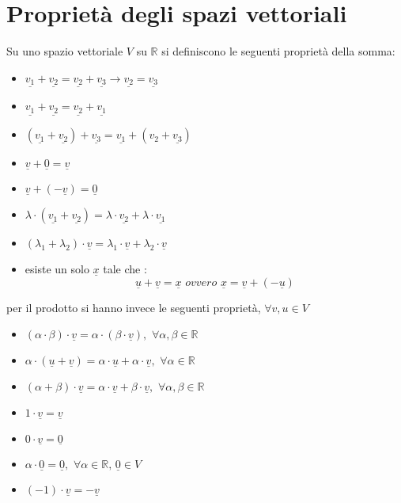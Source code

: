 \documentclass[a4paper,12pt, oneside]{book}
\begin{document}
\section{Proprietà degli spazi vettoriali}
Su uno spazio vettoriale $V$ su $\mathbb{R}$ si definiscono le seguenti proprietà della somma:
\begin{itemize}
	\item $\underline{v_1}+\underline{v_2} = \underline{v_2}+\underline{v_3}\longrightarrow \underline{v_2}=\underline{v_3}$
	\item $\underline{v_1}+\underline{v_2} = \underline{v_2}+\underline{v_1}$
	\item $(\underline{v_1}+\underline{v_2})+\underline{v_3}=\underline{v_1}+(v_2+\underline{v_3})$
	\item $\underline{v}+\underline{0}=\underline{v}$
	\item $\underline{v}+(-\underline{v})=\underline{0}$
	\item $\lambda\cdot(\underline{v_1}+\underline{v_2} )=\lambda\cdot \underline{v_2}+\lambda\cdot\underline{v_1}$
	\item $(\lambda_1+\lambda_2)\cdot \underline{v}=\lambda_1\cdot \underline{v}+\lambda_2\cdot \underline{v}$
	\item esiste un solo $\underline{x}$ tale che :
	      $$\underline{u}+\underline{v}=\underline{x}\,\, ovvero \,\, \underline{x}=\underline{v}+(-\underline{u})$$
\end{itemize}
per il prodotto si hanno invece le seguenti proprietà, $\forall v,u\in V$
\begin{itemize}
	\item $(\alpha\cdot \beta)\cdot \underline{v}=\alpha\cdot (\beta\cdot \underline{v}),\,\, \forall\alpha,\beta \in \mathbb{R}$
	\item $\alpha\cdot (\underline{u}+\underline{v})=\alpha\cdot \underline{u}+\alpha\cdot \underline{v},\,\,\forall\alpha\in\mathbb{R}$
	\item $(\alpha+\beta)\cdot\underline{v}=\alpha\cdot \underline{v}+\beta\cdot \underline{v},\,\,\forall \alpha,\beta\in\mathbb{R}$
	\item $1\cdot \underline{v}=\underline{v}$
	\item $0\cdot \underline{v}=\underline{0}$
	\item $\alpha\cdot \underline{0}=\underline{0},\,\,\forall \alpha\in\mathbb{R},\, \underline{0}\in V$
	\item $(-1)\cdot \underline{v}=-\underline{v}$
\end{itemize}
\end{document}
